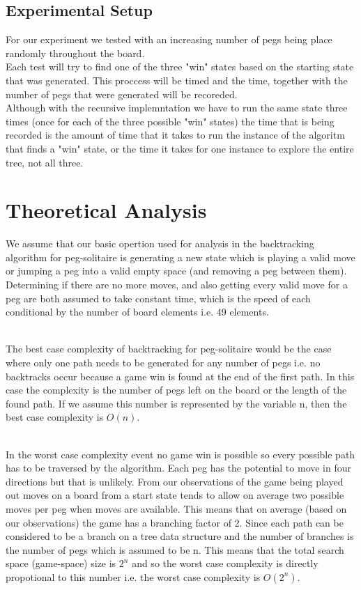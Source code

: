 \documentclass[a4paper]{article}
\begin{document}
\subsection{Experimental Setup}
For our experiment we tested with an increasing number of pegs being place randomly throughout the board.\\
Each test will try to find one of the three "win" states based on the  starting state that was generated. This proccess will be timed and the time, together with the number of pegs that were generated will be recoreded.\\
Although with the recursive implemntation we have  to run the same state three times (once for each of the three possible "win" states) the time that is being recorded is the amount of time that it takes to run the instance of the algoritm that finds a  "win" state, or the time it takes for one instance to explore the entire tree, not all three.\\


\section{Theoretical Analysis}
We assume that our basic opertion used for analysis in the backtracking algorithm for peg-solitaire is generating a new state which is playing a valid move or jumping a peg into a valid empty space (and removing a peg between them). Determining if there are no more moves, and also getting every valid move for a peg are both assumed to take constant time, which is the speed of each conditional by the number of board elements i.e. 49 elements.\\\

\noindent The best case complexity of backtracking for peg-solitaire would be the case where only one path needs to be generated for any number of pegs i.e. no backtracks occur because a game win is found at the end of the first path. In this case the complexity is the number of pegs left on the board or the length of the found path. If we assume this number is represented by the variable n, then the best case complexity is $O(n)$.\\\


\noindent In the worst case complexity event no game win is possible so every possible path has to be traversed by the algorithm. Each peg has the potential to move in four directions but that is unlikely. From our observations of the game being played out moves on a board from a start state tends to allow on average two possible moves per peg when moves are available. This means that on average (based on our observations) the game has a branching factor of 2. Since each path can be considered to be a branch on a tree data structure and the number of branches is the number of pegs which is assumed to be n. This means that the total search space (game-space) size is $2^n$ and so the worst case complexity is directly propotional to this number i.e. the worst case complexity is $O(2^n)$. 
\end{document}
